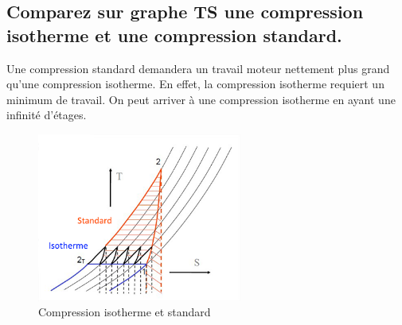 \subsection{Comparez sur graphe TS une compression isotherme et une compression standard.}
Une compression standard demandera un travail moteur nettement plus grand qu'une compression isotherme. En effet, la compression isotherme requiert un minimum de travail. On peut arriver à une compression isotherme en ayant une infinité d'étages.
\begin{figure}[h]\centering
	\includegraphics[width=0.6\textwidth]{figures/compisotherme.png}
	\caption{Compression isotherme et standard}
\end{figure}
